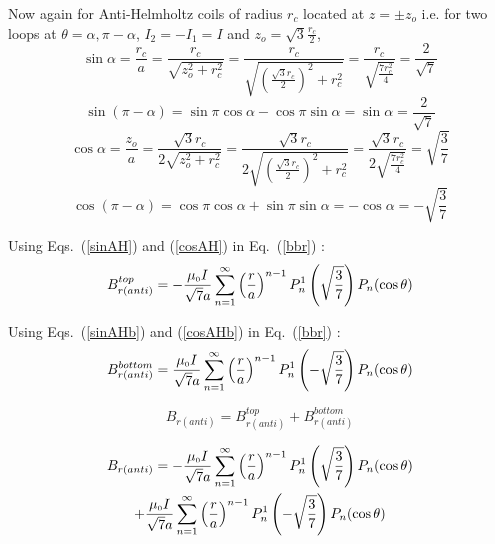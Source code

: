 Now again for Anti-Helmholtz coils of radius \(r_c\) located at \(z=\pm z_o\) i.e. for two loops at \(\theta=\alpha, \pi-\alpha \), \(I_2=-I_1=I\) and \(z_o=\sqrt{3}\frac{r_c}{2}\),
\begin{equation}\label{sinAH}
\sin\alpha=\frac{r_c}{a}=\frac{r_c}{\sqrt{z_o^2+r_c^2}}=\frac{r_c}{\sqrt{\left(\frac{\sqrt{3}r_c}{2}\right)^2+r_c^2}}=\frac{r_c}{\sqrt{\frac{7r_c^2}{4}}}=\frac{2}{\sqrt{7}}
\end{equation}
\begin{equation}\label{sinAHb}
\sin(\pi-\alpha)=\sin\pi\cos\alpha-\cos\pi\sin\alpha=\sin\alpha=\frac{2}{\sqrt{7}}
\end{equation}
\begin{equation}\label{cosAH}
\cos\alpha=\frac{z_o}{a}=\frac{\sqrt{3}r_c}{2\sqrt{z_o^2+r_c^2}}=\frac{\sqrt{3}r_c}{2\sqrt{\left(\frac{\sqrt{3}r_c}{2}\right)^2+r_c^2}}=\frac{\sqrt{3}r_c}{2\sqrt{\frac{7r_c^2}{4}}}=\sqrt{\frac{3}{7}}
\end{equation}
\begin{equation}\label{cosAHb}
\cos(\pi-\alpha)=\cos\pi\cos\alpha+\sin\pi\sin\alpha=-\cos\alpha=-\sqrt{\frac{3}{7}}
\end{equation}

Using Eqs.~(\ref{sinAH}) and (\ref{cosAH}) in Eq.~(\ref{bbr}) :
\begin{equation}\label{bbrAH}
B_{r(anti)}^{top}=-\frac{\mu_{\scriptscriptstyle 0} I }{\sqrt{7}a}\sum_{n=1}^{\infty} \left(\frac{r}{a}\right)^{n-1}P_n^1\left(\sqrt{\frac{3}{7}}\right) P_n(\cos\theta)
\end{equation}

Using Eqs.~(\ref{sinAHb}) and (\ref{cosAHb}) in Eq.~(\ref{bbr}) :
\begin{equation}\label{bbrAHb}
B_{r(anti)}^{bottom}=\frac{\mu_{\scriptscriptstyle 0} I }{\sqrt{7}a}\sum_{n=1}^{\infty} \left(\frac{r}{a}\right)^{n-1}P_n^1\left(-\sqrt{\frac{3}{7}}\right) P_n(\cos\theta)
\end{equation}

$$B_{r(anti)}=B_{r(anti)}^{top}+B_{r(anti)}^{bottom}$$

\begin{multline}\label{brtotAH_1}
    B_{r(anti)}=-\frac{\mu_{\scriptscriptstyle 0} I }{\sqrt{7}a}\sum_{n=1}^{\infty} \left(\frac{r}{a}\right)^{n-1}P_n^1\left(\sqrt{\frac{3}{7}}\right) P_n(\cos\theta) \\+\frac{\mu_{\scriptscriptstyle 0} I }{\sqrt{7}a}\sum_{n=1}^{\infty} \left(\frac{r}{a}\right)^{n-1}P_n^1\left(-\sqrt{\frac{3}{7}}\right) P_n(\cos\theta)
\end{multline}

